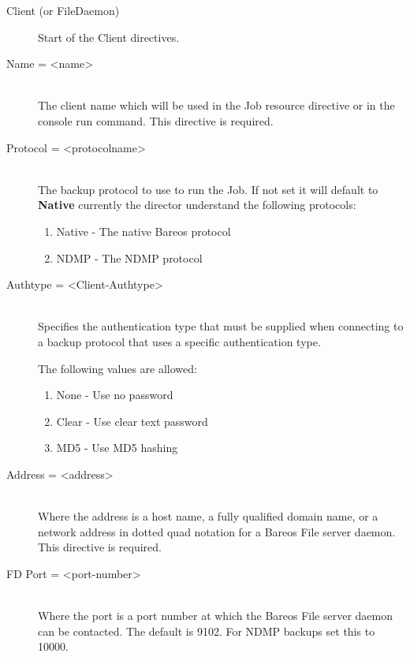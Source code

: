 \begin{description}

\item [Client (or FileDaemon)]
Start of the Client directives.

\item [Name = {\textless}name{\textgreater}] \hfill \\
The client name which will be used in the  Job resource directive or in the
console run command.  This directive is required.

\item [Protocol = {\textless}protocolname{\textgreater}] \hfill \\
The backup protocol to use to run the Job. If not set it will default
to {\bf Native} currently the director understand the following protocols:
\begin{enumerate}
\item Native - The native Bareos protocol
\item NDMP - The NDMP protocol
\end{enumerate}

\item [Authtype = {\textless}Client-Authtype{\textgreater}] \hfill \\
Specifies the authentication type that must be supplied when connecting to
a backup protocol that uses a specific authentication type.

The following values are allowed:
\begin{enumerate}
\item None - Use no password
\item Clear - Use clear text password
\item MD5 - Use MD5 hashing
\end{enumerate}

\item [Address = {\textless}address{\textgreater}] \hfill \\
Where the address is a host name, a fully qualified domain name, or a
network address in dotted quad notation for a Bareos File server daemon.
This directive is required.

\item [FD Port = {\textless}port-number{\textgreater}] \hfill \\
Where the port is a port  number at which the Bareos File server daemon can
be contacted.  The default is 9102. For NDMP backups set this to 10000.


\end{description}
